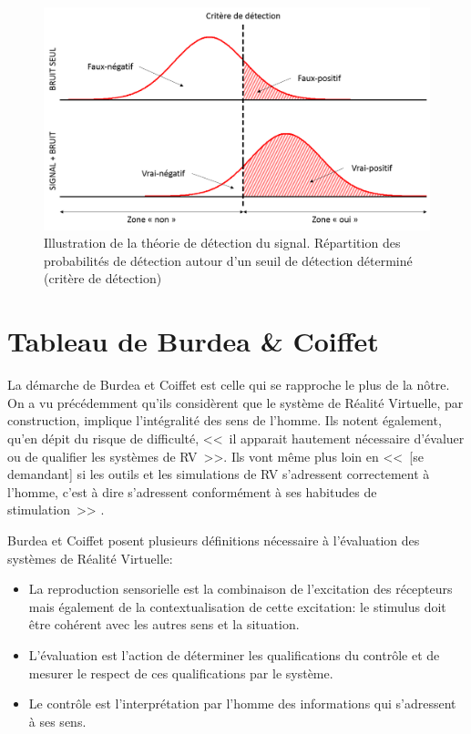 		\begin{figure}[h]
			\centering
			\includegraphics[scale=.5]{Figures/SignalDetectionTheory}
			\caption{Illustration de la théorie de détection du signal. Répartition des probabilités de détection autour d'un seuil de détection déterminé (critère de détection)}
			\label{fig:signal_detection_theory}
		\end{figure}
		
		\section{Tableau de Burdea \& Coiffet}
		\par La démarche de Burdea et Coiffet est celle qui se rapproche le plus de la nôtre. On a vu précédemment qu'ils considèrent que le système de Réalité Virtuelle, par construction, implique l'intégralité des sens de l'homme. Ils notent également, qu'en dépit du risque de difficulté, <<~il apparait hautement nécessaire d'évaluer ou de qualifier les systèmes de RV~>>. Ils vont même plus loin en <<~[se demandant] si les outils et les simulations de RV s'adressent correctement à l'homme, c'est à dire s'adressent conformément à ses habitudes de stimulation~>> \citep{burdea_realite_1993}.
		
		\par Burdea et Coiffet posent plusieurs définitions nécessaire à l'évaluation des systèmes de Réalité Virtuelle:
		\begin{itemize}
			\item La reproduction sensorielle est la combinaison de l'excitation des récepteurs mais également de la contextualisation de cette excitation: le stimulus doit être cohérent avec les autres sens et la situation.
			\item L'évaluation est l'action de déterminer les qualifications du contrôle et de mesurer le respect de ces qualifications par le système.
			\item Le contrôle est l'interprétation par l'homme des informations qui s'adressent à ses sens.
		\end{itemize}
		
